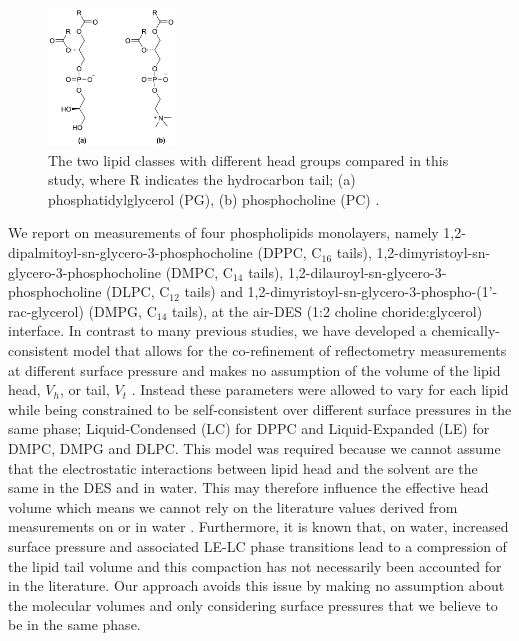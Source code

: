 \documentclass[amsmath,amssymb,twocolumn,superscriptaddress,aps,prl]{revtex4-1}
\begin{document}
%
\begin{figure}[b]
\includegraphics[width=0.3\textwidth]{figures/head_groups}
\caption{\label{fig:heads}\small The two lipid classes with different head
groups compared in this study, where R indicates the hydrocarbon tail;
(a) phosphatidylglycerol (PG), (b) phosphocholine (PC) \cite{SI2018}.}
\end{figure}
%
We report on measurements of four phospholipids monolayers, namely
1,2-dipalmitoyl-sn-glycero-3-phosphocholine (DPPC, C$_{16}$ tails),
1,2-dimyristoyl-sn-glycero-3-phosphocholine (DMPC, C$_{14}$ tails),
1,2-dilauroyl-sn-glycero-3-phosphocholine (DLPC, C$_{12}$ tails) and
1,2-dimyristoyl-sn-glycero-3-phospho-(1'-rac-glycerol)
(DMPG, C$_{14}$ tails), at the air-DES (1:2 choline choride:glycerol)
interface.
In contrast to many previous studies\cite{Mohwald1990,Kewalramani2010,
Bayerl1990,Johnson1991,Clifton2012,Helm1987,Daillant1990}, we have developed
a chemically-consistent model that allows for the
co-refinement of reflectometry measurements at different surface pressure
and makes no assumption of the volume of the lipid head, $V_h$, or tail, $V_t$ \cite{SI2018}.
Instead these parameters were allowed to vary for each lipid while being
constrained to be self-consistent over different surface pressures in the
same phase; Liquid-Condensed (LC) for DPPC and Liquid-Expanded (LE) for
DMPC, DMPG and DLPC.
This model was required because we cannot assume that the electrostatic
interactions between lipid head and the solvent are the same in the DES and
in water. This may therefore influence the effective head volume which means
we cannot rely on the literature values derived from measurements
on or in water \cite{SI2018}.
Furthermore, it is known that, on water, increased surface pressure and
associated LE-LC phase transitions lead to a compression of the lipid tail
volume\cite{Marsh2010,Small1984} and this compaction has not necessarily
been accounted for in the literature\cite{Campbell2018}.
Our approach avoids this issue by making no assumption about the molecular
volumes and only considering surface pressures that we believe to be in the
same phase.
\end{document}

